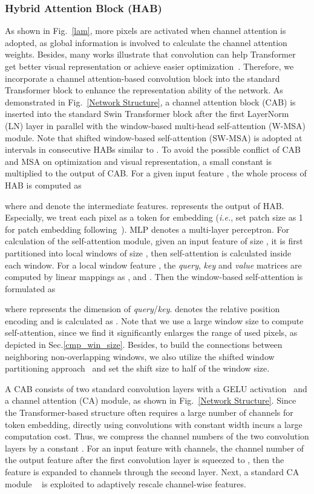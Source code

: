 \documentclass[10pt,twocolumn,letterpaper]{article}
\begin{document}
\subsubsection{Hybrid Attention Block (HAB)} 
\label{HAB}
As shown in Fig.~\ref{lam}, more pixels are activated when channel attention is adopted, as global information is involved to calculate the channel attention weights. Besides, many works illustrate that convolution can help Transformer get better visual representation or achieve easier optimization~\cite{cvt,vitc,ceit,uniformer,spach}. Therefore, we incorporate a channel attention-based convolution block into the standard Transformer block to enhance the representation ability of the network. As demonstrated in Fig.~\ref{Network Structure}, a channel attention block (CAB) is inserted into the standard Swin Transformer block after the first LayerNorm (LN) layer in parallel with the window-based multi-head self-attention (W-MSA) module. Note that shifted window-based self-attention (SW-MSA) is adopted at intervals in consecutive HABs similar to \cite{swin_t,swinir}. 
To avoid the possible conflict of CAB and MSA on optimization and visual representation, a small constant  is multiplied to the output of CAB. For a given input feature , the whole process of HAB is computed as 

where  and  denote the intermediate features.  represents the output of HAB. 
Especially, we treat each pixel as a token for embedding (\textit{i.e.}, set patch size as 1 for patch embedding following~\cite{swinir}). MLP denotes a multi-layer perceptron. For  calculation of the self-attention module, given an input feature of size , it is first partitioned into  local windows of size , then self-attention is calculated inside each window. For a local window feature , the \textit{query}, \textit{key} and \textit{value} matrices are computed by linear mappings as ,  and . Then the window-based self-attention is formulated as 

where  represents the dimension of \textit{query}/\textit{key}.  denotes the relative position encoding and is calculated as \cite{transformer}. Note that we use a large window size to compute self-attention, since we find it significantly enlarges the range of used pixels, as depicted in Sec.\ref{cmp_win_size}. Besides, to build the connections between neighboring non-overlapping windows, we also utilize the shifted window partitioning approach~\cite{swin_t} and set the shift size to half of the window size. 

A CAB consists of two standard convolution layers with a GELU activation~\cite{GELU} and a channel attention (CA) module, as shown in Fig.~\ref{Network Structure}. Since the Transformer-based structure often requires a large number of channels for token embedding, directly using convolutions with constant width incurs a large computation cost. Thus, we compress the channel numbers of the two convolution layers by a constant . For an input feature with  channels, the channel number of the output feature after the first convolution layer is squeezed to , then the feature is expanded to  channels through the second layer. Next, a standard CA module ~\cite{rcan} is exploited to adaptively rescale channel-wise features. 
\end{document}
